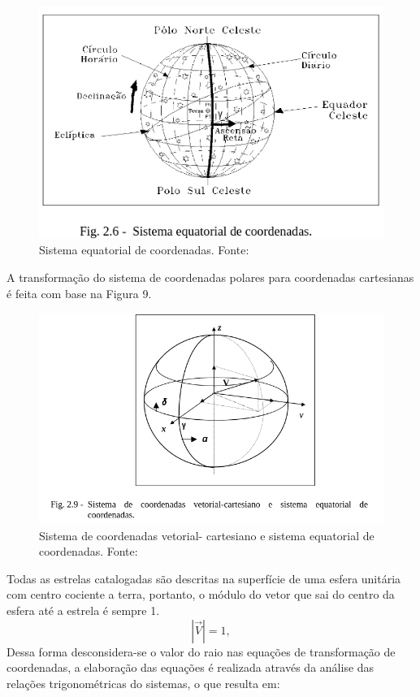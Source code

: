 \begin{figure}[!h]
	\centering
	\includegraphics[width=.7\columnwidth]{images/Sistema_equatorial_de_coordenadas.png}
	\caption{Sistema equatorial de coordenadas. Fonte: ~\cite[]{Carvalho}}
	\label{fig:Sistema_equatorial_de_coordenadas}
\end{figure}

A transformação do sistema de coordenadas polares para coordenadas cartesianas é feita  com base na Figura 9.

\begin{figure}[!h]
	\centering
	\includegraphics[width=.7\columnwidth]{images/Sistema_de_coordenadas_vetorial.png}
	\caption{Sistema de coordenadas vetorial- cartesiano e sistema equatorial de coordenadas. Fonte: ~\cite[]{Carvalho}}
	\label{fig:Sistema_de_coordenadas_vetorial}
\end{figure}


Todas as estrelas catalogadas são descritas na superfície de uma esfera unitária  com centro cociente a terra, portanto, o módulo do vetor que sai do centro da esfera até a estrela é sempre 1.
\begin{equation}
	\left| \overrightarrow{V}\right|=1,
	\label{eq:1}
\end{equation}
Dessa forma desconsidera-se o valor do raio nas equações  de  transformação de coordenadas, a elaboração das equações é realizada através da análise das relações trigonométricas do sistemas, o que resulta em:

